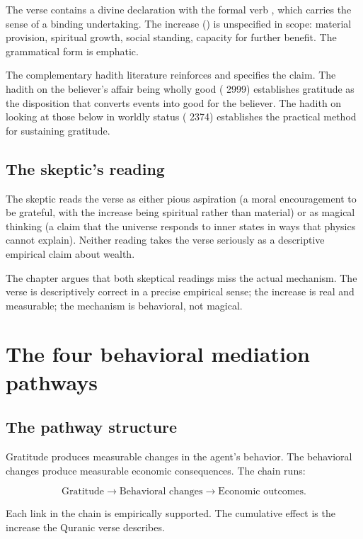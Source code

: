 The verse contains a divine declaration with the formal verb
, which carries the sense of a binding undertaking.
The increase () is unspecified in scope: material
provision, spiritual growth, social standing, capacity for further
benefit. The grammatical form is emphatic.

The complementary hadith literature reinforces and specifies the
claim. The hadith on the believer's affair being wholly good
( 2999) establishes gratitude as the
disposition that converts events into good for the believer. The
hadith on looking at those below in worldly status
( 2374) establishes the practical method for
sustaining gratitude.

\subsection{The skeptic's reading}

The skeptic reads the verse as either pious aspiration (a moral
encouragement to be grateful, with the increase being spiritual
rather than material) or as magical thinking (a claim that the
universe responds to inner states in ways that physics cannot
explain). Neither reading takes the verse seriously as a
descriptive empirical claim about wealth.

The chapter argues that both skeptical readings miss the actual
mechanism. The verse is descriptively correct in a precise empirical
sense; the increase is real and measurable; the mechanism is
behavioral, not magical.

\section{The four behavioral mediation pathways}
\label{sec:grat-pathways}

\subsection{The pathway structure}

Gratitude produces measurable changes in the agent's behavior. The
behavioral changes produce measurable economic consequences. The
chain runs:

\[
    \text{Gratitude} \to \text{Behavioral changes} \to \text{Economic outcomes}.
\]

Each link in the chain is empirically supported. The cumulative
effect is the increase the Quranic verse describes.


